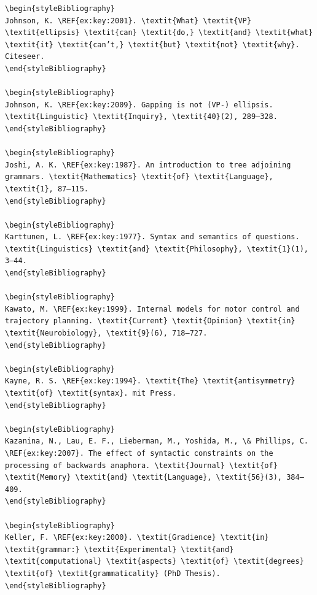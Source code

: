 \begin{verbatim}
\begin{styleBibliography}
Johnson, K. \REF{ex:key:2001}. \textit{What} \textit{VP} \textit{ellipsis} \textit{can} \textit{do,} \textit{and} \textit{what} \textit{it} \textit{can’t,} \textit{but} \textit{not} \textit{why}. Citeseer.
\end{styleBibliography}

\begin{styleBibliography}
Johnson, K. \REF{ex:key:2009}. Gapping is not (VP-) ellipsis. \textit{Linguistic} \textit{Inquiry}, \textit{40}(2), 289–328.
\end{styleBibliography}

\begin{styleBibliography}
Joshi, A. K. \REF{ex:key:1987}. An introduction to tree adjoining grammars. \textit{Mathematics} \textit{of} \textit{Language}, \textit{1}, 87–115.
\end{styleBibliography}

\begin{styleBibliography}
Karttunen, L. \REF{ex:key:1977}. Syntax and semantics of questions. \textit{Linguistics} \textit{and} \textit{Philosophy}, \textit{1}(1), 3–44.
\end{styleBibliography}

\begin{styleBibliography}
Kawato, M. \REF{ex:key:1999}. Internal models for motor control and trajectory planning. \textit{Current} \textit{Opinion} \textit{in} \textit{Neurobiology}, \textit{9}(6), 718–727.
\end{styleBibliography}

\begin{styleBibliography}
Kayne, R. S. \REF{ex:key:1994}. \textit{The} \textit{antisymmetry} \textit{of} \textit{syntax}. mit Press.
\end{styleBibliography}

\begin{styleBibliography}
Kazanina, N., Lau, E. F., Lieberman, M., Yoshida, M., \& Phillips, C. \REF{ex:key:2007}. The effect of syntactic constraints on the processing of backwards anaphora. \textit{Journal} \textit{of} \textit{Memory} \textit{and} \textit{Language}, \textit{56}(3), 384–409.
\end{styleBibliography}

\begin{styleBibliography}
Keller, F. \REF{ex:key:2000}. \textit{Gradience} \textit{in} \textit{grammar:} \textit{Experimental} \textit{and} \textit{computational} \textit{aspects} \textit{of} \textit{degrees} \textit{of} \textit{grammaticality} (PhD Thesis).
\end{styleBibliography}


\end{verbatim}
